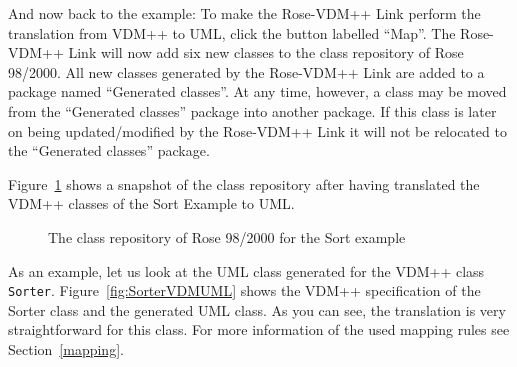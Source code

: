\documentclass[\pformat,12pt]{article}
\newcommand{\vdmpp}{VDM++}
\newcommand{\link}{Rose-\vdmpp{} Link}
\newcommand{\rose}{Rose 98/2000}
\begin{document}
And now back to the example: To make the \link{} perform the
translation from \vdmpp{} to UML, click the button labelled ``Map''.
The \link{} will now add six new classes to the class repository of
\rose{}.  All new classes generated by the \link{} are added to a
package named ``Generated classes''. At any time, however, a class may
be moved from the ``Generated classes'' package into another package.
If this class is later on being updated/modified by the \link{} it
will not be relocated to the ``Generated classes'' package.

Figure~\ref{fig:classrepository} shows a snapshot of the class
repository after having translated the \vdmpp{} classes of the Sort
Example to UML.

\begin{figure}[htb]
\begin{center}
\mbox{}
\caption{The class repository of \rose{} for the Sort example\label{fig:classrepository}}
\end{center}
\end{figure}

As an example, let us look at the UML class generated for the \vdmpp{}
class {\tt Sorter}. Figure~\ref{fig:SorterVDMUML} shows the
\vdmpp{} specification of the Sorter class and the generated UML
class. As you can see, the translation is very straightforward for
this class. For more information of the used mapping rules see
Section~\ref{mapping}.
\end{document}
